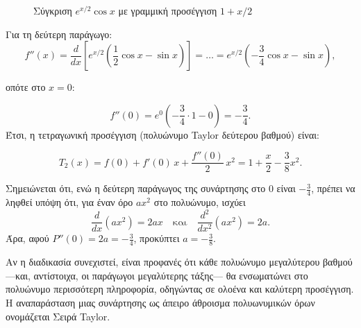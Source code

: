 \documentclass[a4paper, 11pt]{article}
\begin{document}
\begin{figure}[htbp]
\centering
{}
\caption{Σύγκριση $e^{x/2}\cos x$ με γραμμική προσέγγιση $1+x/2$}
\label{fig:expcoslinear}
\end{figure}

Για τη δεύτερη παράγωγο: \[
f''(x) = \frac{d}{dx} \left[ e^{x/2} \left( \frac{1}{2}\cos x - \sin x \right) \right] 
= \dots 
= e^{x/2} \left( -\frac{3}{4}\cos x - \sin x \right),
\]

οπότε στο \(x=0\):

\[
f''(0) = e^{0} \left( -\frac{3}{4} \cdot 1 - 0 \right) = -\frac{3}{4}.
\] Έτσι, η τετραγωνική προσέγγιση (πολυώνυμο Taylor δεύτερου βαθμού)
είναι:

\[
\boxed{T_2(x) = f(0) + f'(0)\,x + \frac{f''(0)}{2}\,x^2 = 1 + \frac{x}{2} - \frac{3}{8}x^2}.
\]

Σημειώνεται ότι, ενώ η δεύτερη παράγωγος της συνάρτησης στο \(0\) είναι
\(-\frac{3}{4}\), πρέπει να ληφθεί υπόψη ότι, για έναν όρο \(a x^2\) στο
πολυώνυμο, ισχύει \[
\frac{d}{dx}(a x^2)=2ax \quad \text{και} \quad \frac{d^2}{dx^2}(a x^2)=2a.
\] Άρα, αφού \(P''(0)=2a=-\frac{3}{4}\), προκύπτει \(a=-\frac{3}{8}\).

Αν η διαδικασία συνεχιστεί, είναι προφανές ότι κάθε πολυώνυμο
μεγαλύτερου βαθμού ---και, αντίστοιχα, οι παράγωγοι μεγαλύτερης τάξης---
θα ενσωματώνει στο πολυώνυμο περισσότερη πληροφορία, οδηγώντας σε ολοένα
και καλύτερη προσέγγιση. Η αναπαράσταση μιας συνάρτησης ως άπειρο
άθροισμα πολυωνυμικών όρων ονομάζεται Σειρά Taylor.
\end{document}

